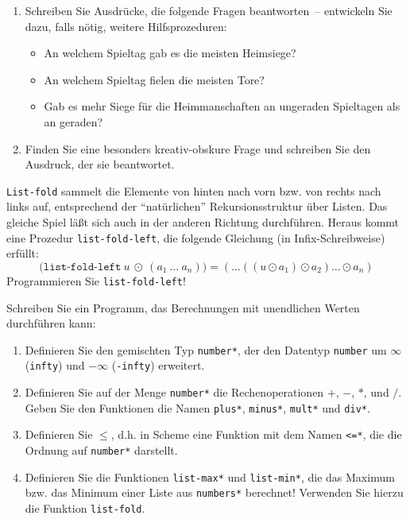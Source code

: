 \begin{aufgabe}
\begin{enumerate}
  \item Schreiben Sie Ausdrücke, die folgende Fragen beantworten~--
  entwickeln Sie dazu, falls nötig, weitere Hilfsprozeduren:
  \begin{itemize}
    \item An welchem Spieltag gab es die meisten Heimsiege?
    \item An welchem Spieltag fielen die meisten Tore?
    \item Gab es mehr Siege für die Heimmanschaften an ungeraden Spieltagen als an
      geraden?
    \end{itemize}
    
  \item Finden Sie eine besonders
    kreativ-obskure Frage und schreiben Sie den Ausdruck, der sie
    beantwortet.
\end{enumerate} 

\end{aufgabe}

\begin{aufgabe}
  \texttt{List-fold} sammelt die Elemente von hinten nach vorn bzw.
  von rechts nach links auf, entsprechend der "`natürlichen"'
  Rekursionsstruktur über Listen.  Das gleiche Spiel läßt sich auch in
  der anderen Richtung durchführen.  Heraus kommt eine Prozedur
  \texttt{list-fold-left}, die folgende Gleichung (in
  Infix-Schreibweise) erfüllt:
  \begin{displaymath}
    \texttt{(list-fold-left}~u~\odot~(a_1~\ldots~a_n)\texttt{)}
    = (\ldots((u\odot a_1)\odot a_2)\ldots\odot a_n)
  \end{displaymath}
  Programmieren Sie \texttt{list-fold-left}!
\end{aufgabe}


\begin{aufgabe}
  Schreiben Sie ein Programm, das Berechnungen
  mit unendlichen Werten durchführen kann:
  
  \begin{enumerate}
  \item Definieren Sie den gemischten Typ \texttt{number*}, der den
    Datentyp \texttt{number} um $\infty$ (\texttt{infty}) und $- \infty$
    (\texttt{-infty}) erweitert.
  \item Definieren Sie auf der Menge \texttt{number*} die
    Rechenoperationen $+$, $-$, $*$, und $/$.  Geben Sie den Funktionen
    die Namen \texttt{plus*}, \texttt{minus*}, \texttt{mult*} und
    \texttt{div*}.
  \item Definieren Sie $\leq$, d.h. in Scheme eine Funktion mit dem
    Namen \texttt{<=*}, die die Ordnung auf \texttt{number*} darstellt.
  \item Definieren Sie die Funktionen \texttt{list-max*} und
    \texttt{list-min*}, die das Maximum bzw. das Minimum einer Liste 
    aus \texttt{numbers*} berechnet!  Verwenden Sie hierzu die Funktion \texttt{list-fold}.
  \end{enumerate}
\end{aufgabe}

